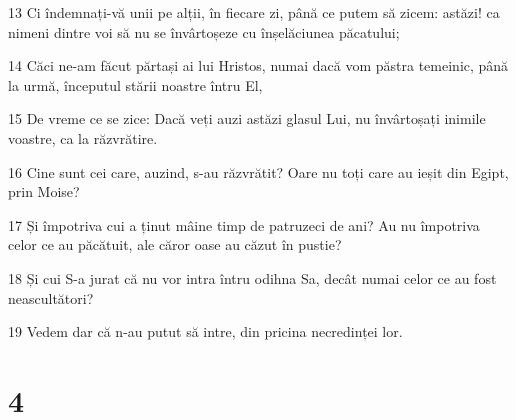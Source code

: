 \par 13 Ci îndemnați-vă unii pe alții, în fiecare zi, până ce putem să zicem: astăzi! ca nimeni dintre voi să nu se învârtoșeze cu înșelăciunea păcatului;
\par 14 Căci ne-am făcut părtași ai lui Hristos, numai dacă vom păstra temeinic, până la urmă, începutul stării noastre întru El,
\par 15 De vreme ce se zice: Dacă veți auzi astăzi glasul Lui, nu învârtoșați inimile voastre, ca la răzvrătire.
\par 16 Cine sunt cei care, auzind, s-au răzvrătit? Oare nu toți care au ieșit din Egipt, prin Moise?
\par 17 Și împotriva cui a ținut mâine timp de patruzeci de ani? Au nu împotriva celor ce au păcătuit, ale căror oase au căzut în pustie?
\par 18 Și cui S-a jurat că nu vor intra întru odihna Sa, decât numai celor ce au fost neascultători?
\par 19 Vedem dar că n-au putut să intre, din pricina necredinței lor.

\chapter{4}

